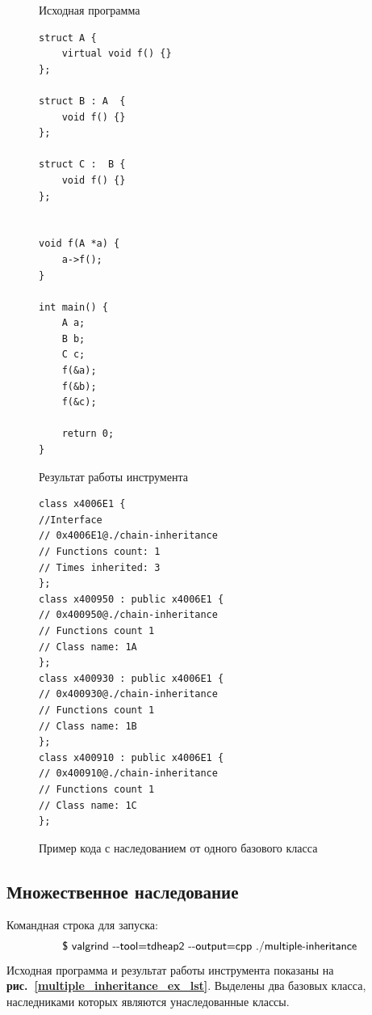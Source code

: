 \documentclass[a4paper,12pt,russian]{article}
\newcommand{\picref}[1]{\textbf{рис.~\ref{#1}}}
\newcommand{\code}[1]{\textsf{#1}}
\begin{document}
\begin{figure}[h!]
\begin{minipage}[t]{0.45\linewidth}
\caption*{Исходная программа}
\begin{lstlisting}
struct A {
    virtual void f() {}
};

struct B : A  {
    void f() {}
};

struct C :  B {
    void f() {}
};


void f(A *a) {
    a->f();
}

int main() {
    A a;
    B b;
    C c;
    f(&a);
    f(&b);
    f(&c);

    return 0;
}
\end{lstlisting}
\end{minipage}
\begin{minipage}[t]{0.5\linewidth}
\caption*{Результат работы инструмента}
\begin{lstlisting}
class x4006E1 {
//Interface
// 0x4006E1@./chain-inheritance
// Functions count: 1
// Times inherited: 3
};
class x400950 : public x4006E1 {
// 0x400950@./chain-inheritance
// Functions count 1
// Class name: 1A
};
class x400930 : public x4006E1 {
// 0x400930@./chain-inheritance
// Functions count 1
// Class name: 1B
};
class x400910 : public x4006E1 {
// 0x400910@./chain-inheritance
// Functions count 1
// Class name: 1C
};
\end{lstlisting}
\end{minipage}
\caption{Пример кода с наследованием от одного базового класса}
\label{chain_inheritance_ex_lst}
\end{figure}

\subsection{Множественное наследование}
Командная строка для запуска:
\[\mbox{\code{\$ valgrind -{}-tool=tdheap2 -{}-output=cpp ./multiple-inheritance}}\]
Исходная программа и результат работы инструмента показаны на \picref{multiple_inheritance_ex_lst}.
Выделены два базовых класса, наследниками которых являются унаследованные классы.
\end{document}
